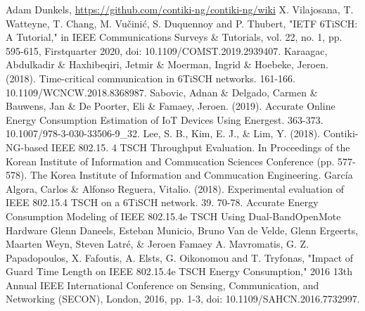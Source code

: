 \documentclass[conference]{IEEEtran}
\begin{document}
\begin{thebibliography}{00}
 Adam Dunkels, \url {https://github.com/contiki-ng/contiki-ng/wiki}
 X. Vilajosana, T. Watteyne, T. Chang, M. Vučinić, S. Duquennoy and P. Thubert, "IETF 6TiSCH: A Tutorial," in IEEE Communications Surveys \& Tutorials, vol. 22, no. 1, pp. 595-615, Firstquarter 2020, doi: 10.1109/COMST.2019.2939407.
 Karaagac, Abdulkadir \& Haxhibeqiri, Jetmir \& Moerman, Ingrid \& Hoebeke, Jeroen. (2018). Time-critical communication in 6TiSCH networks. 161-166. 10.1109/WCNCW.2018.8368987. 
 Sabovic, Adnan \& Delgado, Carmen \& Bauwens, Jan \& De Poorter, Eli \& Famaey, Jeroen. (2019). Accurate Online Energy Consumption Estimation of IoT Devices Using Energest. 363-373. 10.1007/978-3-030-33506-9\_32. 
 Lee, S. B., Kim, E. J., \& Lim, Y. (2018). Contiki-NG-based IEEE 802.15. 4 TSCH Throughput Evaluation. In Proceedings of the Korean Institute of Information and Commucation Sciences Conference (pp. 577-578). The Korea Institute of Information and Commucation Engineering.
 García Algora, Carlos \& Alfonso Reguera, Vitalio. (2018). Experimental evaluation of IEEE 802.15.4 TSCH on a 6TiSCH network. 39. 70-78.
 Accurate Energy Consumption Modeling of IEEE 802.15.4e TSCH Using Dual-BandOpenMote Hardware
Glenn Daneels, Esteban Municio, Bruno Van de Velde, Glenn Ergeerts, Maarten Weyn, Steven Latré, \& Jeroen Famaey
A. Mavromatis, G. Z. Papadopoulos, X. Fafoutis, A. Elsts, G. Oikonomou and T. Tryfonas, "Impact of Guard Time Length on IEEE 802.15.4e TSCH Energy Consumption," 2016 13th Annual IEEE International Conference on Sensing, Communication, and Networking (SECON), London, 2016, pp. 1-3, doi: 10.1109/SAHCN.2016.7732997.
\end{thebibliography}
\end{document}
